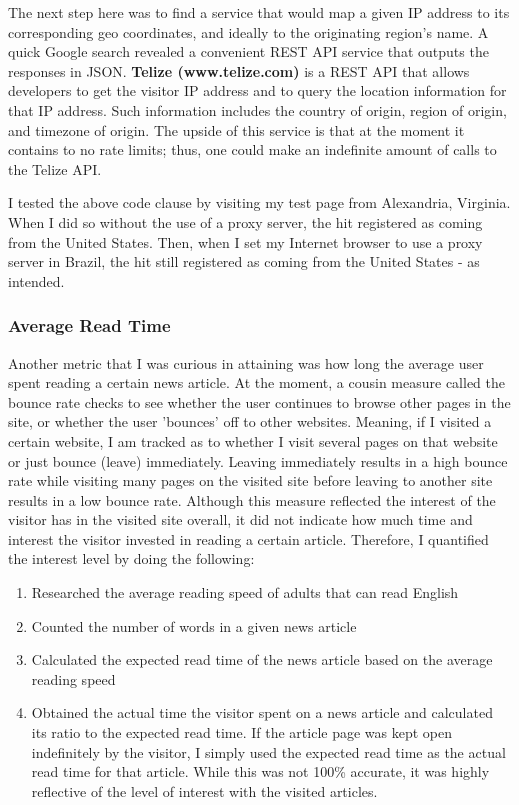 \documentclass[12pt]{article}
\begin{document}
The next step here was to find a service that would map a given IP address to its corresponding geo coordinates, and ideally to the originating region's name. A quick Google search revealed a convenient REST API service that outputs the responses in JSON. \textbf{Telize (www.telize.com)} is a REST API that allows developers to get the visitor IP address and to query the location information for that IP address. Such information includes the country of origin, region of origin, and timezone of origin. The upside of this service is that at the moment it contains to no rate limits; thus, one could make an indefinite amount of calls to the Telize API.

I tested the above code clause by visiting my test page from Alexandria, Virginia. When I did so without the use of a proxy server, the hit registered as coming from the United States. Then, when I set my Internet browser to use a proxy server in Brazil, the hit still registered as coming from the United States - as intended.

\subsubsection{Average Read Time}

Another metric that I was curious in attaining was how long the average user spent reading a certain news article. At the moment, a cousin measure called the bounce rate checks to see whether the user continues to browse other pages in the site, or whether the user 'bounces' off to other websites. Meaning, if I visited a certain website, I am tracked as to whether I visit several pages on that website or just bounce (leave) immediately. Leaving immediately results in a high bounce rate while visiting many pages on the visited site before leaving to another site results in a low bounce rate. 
Although this measure reflected the interest of the visitor has in the visited site overall, it did not indicate how much time and interest the visitor invested in reading a certain article. Therefore, I quantified the interest level by doing the following:
\begin{enumerate}
\item Researched the average reading speed of adults that can read English
\item Counted the number of words in a given news article
\item Calculated the expected read time of the news article based on the average reading speed
\item Obtained the actual time the visitor spent on a news article and calculated its ratio to the expected read time. If the article page was kept open indefinitely by the visitor, I simply used the expected read time as the actual read time for that article. While this was not 100\% accurate, it was highly reflective of the level of interest with the visited articles.
\end{enumerate}     
\end{document}
